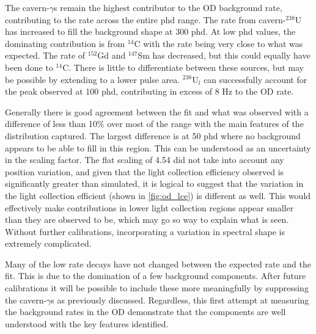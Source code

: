 \par
The cavern-$\gamma$s remain the highest contributor to the OD background rate, contributing to the rate across the entire phd range.
The rate from cavern-${}^{238}$U has increased to fill the background shape at 300 phd.
At low phd values, the dominating contribution is from ${}^{14}$C with the rate being very close to what was expected.
The rate of ${}^{152}$Gd and ${}^{147}$Sm has decreased, but this could equally have been done to ${}^{14}$C.
There is little to differentiate between these sources, but may be possible by extending to a lower pulse area.
${}^{238}$U$_l$ can successfully account for the peak observed at 100 phd, contributing in excess of 8 Hz to the OD rate.
\par
Generally there is good agreement between the fit and what was observed with a difference of less than 10\% over most of the range with the main features of the distribution captured.
The largest difference is at 50 phd where no background appears to be able to fill in this region.
This can be understood as an uncertainty in the scaling factor.
The flat scaling of 4.54 did not take into account any position variation, and given that the light collection efficiency observed is significantly greater than simulated, it is logical to suggest that the variation in the light collection efficient (shown in \autoref{fig:od_lce}) is different as well.
This would effectively make contributions in lower light collection regions appear smaller than they are observed to be, which may go so way to explain what is seen.
Without further calibrations, incorporating a variation in spectral shape is extremely complicated.
\par
Many of the low rate decays have not changed between the expected rate and the fit.
This is due to the domination of a few background components.
After future calibrations it will be possible to include these more meaningfully by suppressing the cavern-$\gamma$s as previously discussed.
Regardless, this first attempt at measuring the background rates in the OD demonstrate that the components are well understood with the key features identified.




